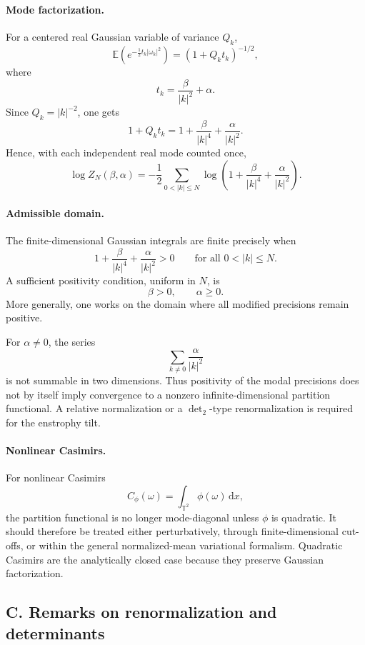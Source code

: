 \documentclass[11pt,reqno]{amsart}
\begin{document}
\paragraph{Mode factorization.}
For a centered real Gaussian variable of variance $Q_k$,
\[
\mathbb E
\left(
e^{-\frac12t_k|\omega_k|^2}
\right)
=
(1+Q_kt_k)^{-1/2},
\]
where
\[
t_k=\frac{\beta}{|k|^2}+\alpha.
\]
Since $Q_k=|k|^{-2}$, one gets
\[
1+Q_kt_k
=
1+\frac{\beta}{|k|^4}
+\frac{\alpha}{|k|^2}.
\]
Hence, with each independent real mode counted once,
\[
\boxed{
\log Z_N(\beta,\alpha)
=
-\frac12
\sum_{0<|k|\leq N}
\log\left(
1+\frac{\beta}{|k|^4}
+\frac{\alpha}{|k|^2}
\right).
}
\]

\paragraph{Admissible domain.}
The finite-dimensional Gaussian integrals are finite precisely when
\[
1+\frac{\beta}{|k|^4}+\frac{\alpha}{|k|^2}>0
\qquad
\text{for all }0<|k|\leq N.
\]
A sufficient positivity condition, uniform in $N$, is
\[
\beta>0,
\qquad
\alpha\geq 0.
\]
More generally, one works on the domain where all modified precisions
remain positive.

For $\alpha\neq 0$, the series
\[
\sum_{k\neq 0}
\frac{\alpha}{|k|^2}
\]
is not summable in two dimensions. Thus positivity of the modal
precisions does not by itself imply convergence to a nonzero
infinite-dimensional partition functional. A relative normalization or
a $\det_2$-type renormalization is required for the enstrophy tilt.

\paragraph{Nonlinear Casimirs.}
For nonlinear Casimirs
\[
C_\phi(\omega)
=
\int_{\mathbb T^2}\phi(\omega)\,\mathrm dx,
\]
the partition functional is no longer mode-diagonal unless $\phi$ is
quadratic. It should therefore be treated either perturbatively, through
finite-dimensional cut-offs, or within the general normalized-mean
variational formalism. Quadratic Casimirs are the analytically closed
case because they preserve Gaussian factorization.

\subsection*{C. Remarks on renormalization and determinants}
\end{document}
